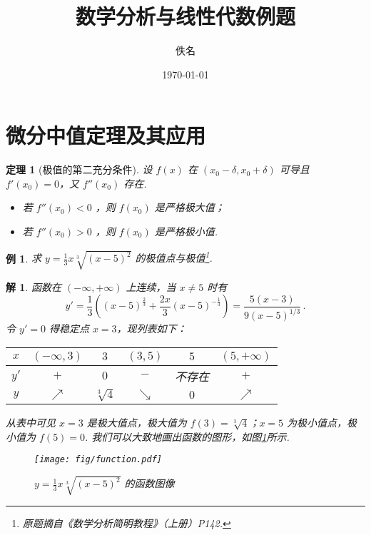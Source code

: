 \documentclass[UTF8,11pt]{ctexart}
\title{数学分析与线性代数例题}
\author{佚名}
\date{\today}
\newtheorem{theorem}{定理}
\newtheorem{example}{例}
\newtheorem*{answer}{解}
\begin{document}
\maketitle
\tableofcontents

\section{微分中值定理及其应用}
\begin{theorem}[极值的第二充分条件]
设 $f(x)$ 在 $(x_0-\delta,x_0+\delta)$ 可导且 $f'(x_0)=0$，又 $f''(x_0)$ 存在.
\begin{itemize}
	\item [1)] 若 $f''(x_0)<0$ ，则 $f(x_0)$ 是严格极大值；
	\item [2)] 若 $f''(x_0)>0$ ，则 $f(x_0)$ 是严格极小值.
\end{itemize}
\end{theorem}

\begin{example}
求 $y=\frac{1}{3}x\sqrt[3]{(x-5)^2}$ 的极值点与极值\footnote{原题摘自《数学分析简明教程》（上册）P142.}.
\end{example}
\begin{answer}
函数在 $(-\infty,+\infty)$ 上连续，当 $x\ne 5$ 时有
\begin{equation}
y'=\frac{1}{3}\left((x-5)^\frac{2}{3}+\frac{2x}{3}(x-5)^{-\frac{1}{3}}\right)
=\frac{5(x-3)}{9(x-5)^{1/3}}\,.
\end{equation}
令 $y'=0$ 得稳定点 $x=3$，现列表如下：
\begin{center}
\begin{tabular}{|c|c|c|c|c|c|}\hline
$x$ & $(-\infty,3)$ & $3$ & $(3,5)$ & $5$ & $(5,+\infty)$ \\\hline
$y'$ & $+$ & $0$ & $-$ & 不存在 & $+$\\\hline
$y$ & $\nearrow$ & $\sqrt[3]{4}$ & $\searrow$ & $0$ & $\nearrow$\\\hline
\end{tabular}
\end{center}

从表中可见 $x=3$ 是极大值点，极大值为 $f(3)=\sqrt[3]{4}$；$x=5$ 为极小值点，极小值为 $f(5)=0$.
我们可以大致地画出函数的图形，如图\ref{fig:function}所示.
\begin{figure}[htbp]
\centering
\texttt{[image: fig/function.pdf]}
\caption{$y=\frac{1}{3}x\sqrt[3]{(x-5)^2}$ 的函数图像}
\label{fig:function}
\end{figure}
\end{answer}
\end{document}
